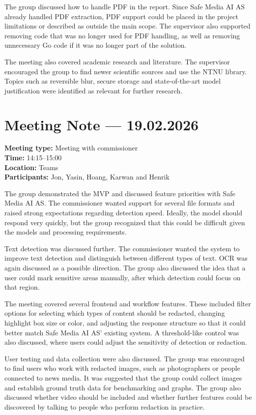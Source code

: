 The group discussed how to handle PDF in the report. Since Safe Media AI AS already handled PDF extraction, PDF support could be placed in the project limitations or described as outside the main scope. The supervisor also supported removing code that was no longer used for PDF handling, as well as removing unnecessary Go code if it was no longer part of the solution.

The meeting also covered academic research and literature. The supervisor encouraged the group to find newer scientific sources and use the NTNU library. Topics such as reversible blur, secure storage and state-of-the-art model justification were identified as relevant for further research.

\section{Meeting Note --- 19.02.2026}
\label{app:meeting-2026-02-19}
\textbf{Meeting type:} Meeting with commissioner\\
\textbf{Time:} 14:15--15:00\\
\textbf{Location:} Teams\\
\textbf{Participants:} Jon, Yasin, Hoang, Karwan and Henrik

The group demonstrated the MVP and discussed feature priorities with Safe Media AI AS. The commissioner wanted support for several file formats and raised strong expectations regarding detection speed. Ideally, the model should respond very quickly, but the group recognized that this could be difficult given the models and processing requirements.

Text detection was discussed further. The commissioner wanted the system to improve text detection and distinguish between different types of text. OCR was again discussed as a possible direction. The group also discussed the idea that a user could mark sensitive areas manually, after which detection could focus on that region.

The meeting covered several frontend and workflow features. These included filter options for selecting which types of content should be redacted, changing highlight box size or color, and adjusting the response structure so that it could better match Safe Media AI AS' existing system. A threshold-like control was also discussed, where users could adjust the sensitivity of detection or redaction.

User testing and data collection were also discussed. The group was encouraged to find users who work with redacted images, such as photographers or people connected to news media. It was suggested that the group could collect images and establish ground truth data for benchmarking and graphs. The group also discussed whether video should be included and whether further features could be discovered by talking to people who perform redaction in practice.


